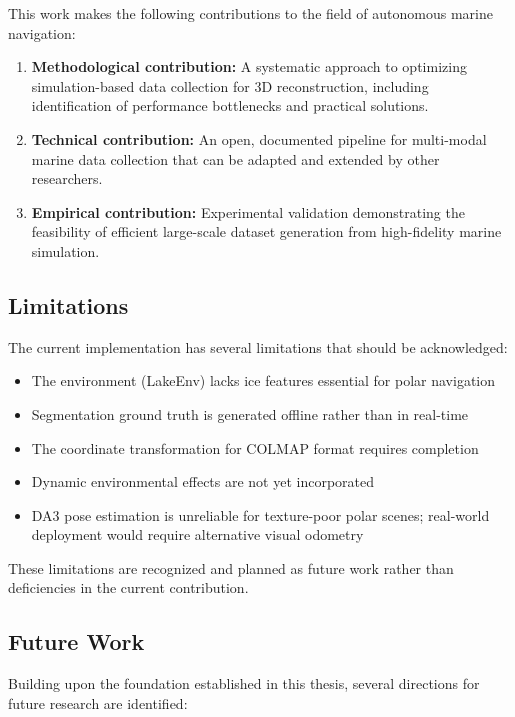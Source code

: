 This work makes the following contributions to the field of autonomous marine navigation:

\begin{enumerate}
    \item \textbf{Methodological contribution:} A systematic approach to optimizing simulation-based data collection for 3D reconstruction, including identification of performance bottlenecks and practical solutions.

    \item \textbf{Technical contribution:} An open, documented pipeline for multi-modal marine data collection that can be adapted and extended by other researchers.

    \item \textbf{Empirical contribution:} Experimental validation demonstrating the feasibility of efficient large-scale dataset generation from high-fidelity marine simulation.
\end{enumerate}

\subsection{Limitations}

The current implementation has several limitations that should be acknowledged:

\begin{itemize}
    \item The environment (LakeEnv) lacks ice features essential for polar navigation
    \item Segmentation ground truth is generated offline rather than in real-time
    \item The coordinate transformation for COLMAP format requires completion
    \item Dynamic environmental effects are not yet incorporated
    \item DA3 pose estimation is unreliable for texture-poor polar scenes; real-world deployment would require alternative visual odometry
\end{itemize}

These limitations are recognized and planned as future work rather than deficiencies in the current contribution.

\subsection{Future Work}

Building upon the foundation established in this thesis, several directions for future research are identified:

